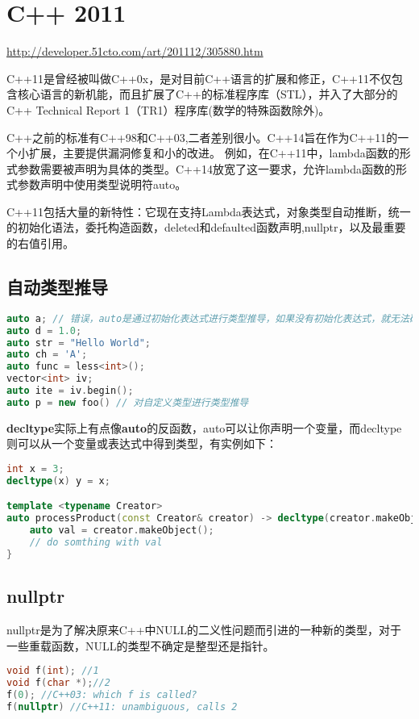 \section{C++ 2011}

\url{http://developer.51cto.com/art/201112/305880.htm}

C++11是曾经被叫做C++0x，是对目前C++语言的扩展和修正，C++11不仅包含核心语言的新机能，而且扩展了C++的标准程序库（STL），并入了大部分的C++ Technical Report 1（TR1）程序库(数学的特殊函数除外)。

C++之前的标准有C++98和C++03,二者差别很小。C++14旨在作为C++11的一个小扩展，主要提供漏洞修复和小的改进。
例如，在C++11中，lambda函数的形式参数需要被声明为具体的类型。C++14放宽了这一要求，允许lambda函数的形式参数声明中使用类型说明符auto。

C++11包括大量的新特性：它现在支持Lambda表达式，对象类型自动推断，统一的初始化语法，委托构造函数，deleted和defaulted函数声明,nullptr，以及最重要的右值引用。


\subsection{自动类型推导}
\begin{lstlisting}[language=C++]
auto a; // 错误，auto是通过初始化表达式进行类型推导，如果没有初始化表达式，就无法确定a的类型  
auto d = 1.0;  
auto str = "Hello World";  
auto ch = 'A';  
auto func = less<int>();  
vector<int> iv;  
auto ite = iv.begin();  
auto p = new foo() // 对自定义类型进行类型推导 
\end{lstlisting}

\textbf{decltype}实际上有点像\textbf{auto}的反函数，auto可以让你声明一个变量，而decltype则可以从一个变量或表达式中得到类型，有实例如下：
\begin{lstlisting}[language=C++]
int x = 3;  
decltype(x) y = x;

template <typename Creator>  
auto processProduct(const Creator& creator) -> decltype(creator.makeObject()) {  
    auto val = creator.makeObject();  
    // do somthing with val  
} 
\end{lstlisting}

\subsection{nullptr}
nullptr是为了解决原来C++中NULL的二义性问题而引进的一种新的类型，对于一些重载函数，NULL的类型不确定是整型还是指针。
\begin{lstlisting}[language=C++]
void f(int); //1  
void f(char *);//2  
f(0); //C++03: which f is called?
f(nullptr) //C++11: unambiguous, calls 2
\end{lstlisting}

